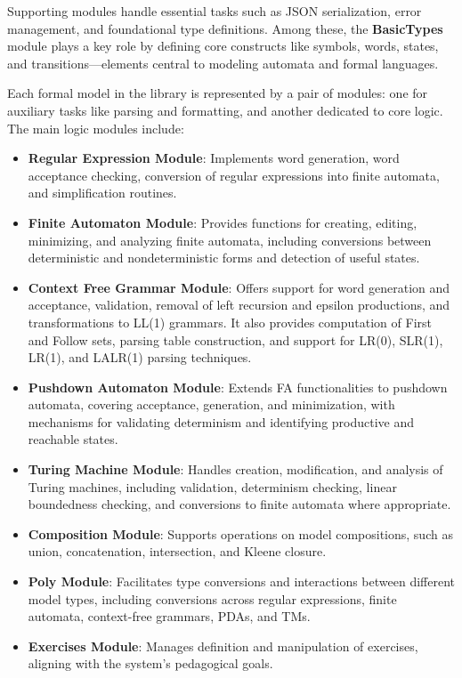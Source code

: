 Supporting modules handle essential tasks such as JSON serialization, error management, and foundational type definitions. 
Among these, the \textbf{BasicTypes} module plays a key role by defining core constructs like symbols, words, states, 
and transitions—elements central to modeling automata and formal languages.

Each formal model in the library is represented by a pair of modules: one for auxiliary tasks like parsing and formatting, and another dedicated to core logic. The main logic modules include:
\begin{itemize}
\item \textbf{Regular Expression Module}: Implements word generation, word acceptance checking, conversion of regular expressions into finite automata, and simplification routines.
\item \textbf{Finite Automaton Module}: Provides functions for creating, editing, minimizing, and analyzing finite automata, including conversions between deterministic and nondeterministic forms and detection of useful states.
\item \textbf{Context Free Grammar Module}: Offers support for word generation and acceptance, validation, removal of left recursion and epsilon productions, and transformations to LL(1) grammars. It also provides computation of First and Follow sets, parsing table construction, and support for LR(0), SLR(1), LR(1), and LALR(1) parsing techniques.
\item \textbf{Pushdown Automaton Module}: Extends FA functionalities to pushdown automata, covering acceptance, generation, and minimization, with mechanisms for validating determinism and identifying productive and reachable states.
\item \textbf{Turing Machine Module}: Handles creation, modification, and analysis of Turing machines, including validation, determinism checking, linear boundedness checking, and conversions to finite automata where appropriate.
\item \textbf{Composition Module}: Supports operations on model compositions, such as union, concatenation, intersection, and Kleene closure.
\item \textbf{Poly Module}: Facilitates type conversions and interactions between different model types, including conversions across regular expressions, finite automata, context-free grammars, PDAs, and TMs.
\item \textbf{Exercises Module}: Manages definition and manipulation of exercises, aligning with the system's pedagogical goals.
\end{itemize}

